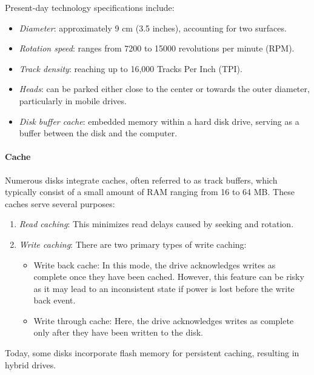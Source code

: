 Present-day technology specifications include:
\begin{itemize}
    \item \textit{Diameter}: approximately 9 cm (3.5 inches), accounting for two surfaces.
    \item \textit{Rotation speed}: ranges from 7200 to 15000 revolutions per minute (RPM).
    \item \textit{Track density}: reaching up to 16,000 Tracks Per Inch (TPI).
    \item \textit{Heads}: can be parked either close to the center or towards the outer diameter, particularly in mobile drives.
    \item \textit{Disk buffer cache}: embedded memory within a hard disk drive, serving as a buffer between the disk and the computer.
\end{itemize}

\paragraph*{Cache}
Numerous disks integrate caches, often referred to as track buffers, which typically consist of a small amount of RAM ranging from 16 to 64 MB.\@
These caches serve several purposes:
\begin{enumerate}
    \item \textit{Read caching}: This minimizes read delays caused by seeking and rotation.
    \item \textit{Write caching}: There are two primary types of write caching:
        \begin{itemize}
            \item Write back cache: In this mode, the drive acknowledges writes as complete once they have been cached. 
                However, this feature can be risky as it may lead to an inconsistent state if power is lost before the write back event.
            \item Write through cache: Here, the drive acknowledges writes as complete only after they have been written to the disk.
        \end{itemize}
\end{enumerate}
Today, some disks incorporate flash memory for persistent caching, resulting in hybrid drives.

